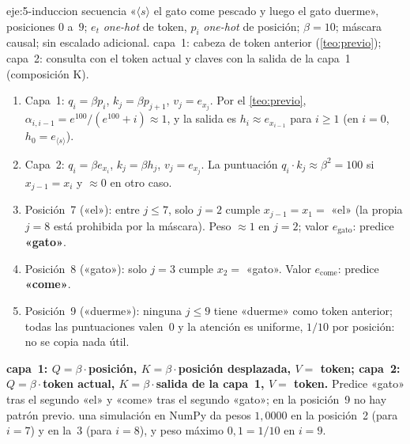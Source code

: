 \begin{solucion}{eje:5-induccion}
\datos secuencia «$\langle s\rangle$ el gato come pescado y luego el gato duerme», posiciones $0$ a~$9$; $e_t$ \emph{one-hot} de token, $p_i$ \emph{one-hot} de posición; $\beta=10$; máscara causal; sin escalado adicional.
\planteamiento capa~1: cabeza de token anterior (\cref{teo:previo}); capa~2: consulta con el token actual y claves con la salida de la capa~1 (composición K).
\pasos
\begin{enumerate}[label=\arabic*.]
  \item Capa~1: $q_i=\beta p_i$, $k_j=\beta p_{j+1}$, $v_j=e_{x_j}$. Por el \cref{teo:previo}, $\alpha_{i,i-1}=e^{100}/(e^{100}+i)\approx1$, y la salida es $h_i\approx e_{x_{i-1}}$ para $i\ge1$ (en $i=0$, $h_0=e_{\langle s\rangle}$).
  \item Capa~2: $q_i=\beta e_{x_i}$, $k_j=\beta h_j$, $v_j=e_{x_j}$. La puntuación $q_i\cdot k_j\approx\beta^{2}=100$ si $x_{j-1}=x_i$ y $\approx0$ en otro caso.
  \item Posición~7 («el»): entre $j\le7$, solo $j=2$ cumple $x_{j-1}=x_1=$ «el» (la propia $j=8$ está prohibida por la máscara). Peso $\approx1$ en $j=2$; valor $e_{\text{gato}}$: predice \textbf{«gato»}.
  \item Posición~8 («gato»): solo $j=3$ cumple $x_{2}=$ «gato». Valor $e_{\text{come}}$: predice \textbf{«come»}.
  \item Posición~9 («duerme»): ninguna $j\le9$ tiene «duerme» como token anterior; todas las puntuaciones valen~0 y la atención es uniforme, $1/10$ por posición: no se copia nada útil.
\end{enumerate}
\resultado \textbf{capa~1: $Q=\beta\cdot$posición, $K=\beta\cdot$posición desplazada, $V=$ token; capa~2: $Q=\beta\cdot$token actual, $K=\beta\cdot$salida de la capa~1, $V=$ token.} Predice «gato» tras el segundo «el» y «come» tras el segundo «gato»; en la posición~9 no hay patrón previo.
\comprobacion una simulación en NumPy da pesos $1{,}0000$ en la posición~2 (para $i=7$) y en la~3 (para $i=8$), y peso máximo $0{,}1=1/10$ en $i=9$.
\end{solucion}

